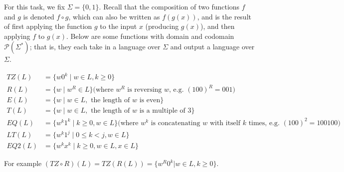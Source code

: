 \documentclass[12pt, oneside]{article}
\begin{document}
	For this task, we fix $\Sigma = \{0,1\}$. Recall that the composition of two 
	functions $f$ and $g$ is denoted $f \circ g$, which can also be written as $f(g(x))$, and is the 
	result of first applying the function $g$ to the input $x$ (producing $g(x)$), and then applying $f$ to $g(x)$. 
	Below are some functions with domain and codomain $\mathcal{P}(\Sigma^*)$; that is, they 
	each take in a language over $\Sigma$
	and output a language over $\Sigma$. 
	
	\begin{align*}
		TZ(L) &= \{ w0^k \mid w \in L, k \geq 0 \}\\
		R(L) &= \{ w \mid w^R \in L\} \textrm{(where $w^R$ is reversing $w$, e.g. $(100)^R = 001$)}\\
		E(L) &= \{ w \mid w \in L, \textrm{ the length of $w$ is even} \} \\
		T(L) &= \{ w \mid w \in L, \textrm{ the length of $w$ is a multiple of } 3 \}\\
		EQ(L) &= \{ w^k1^k \mid k \geq 0, w \in L \} \textrm{(where $w^k$ is concatenating $w$ with itself $k$ times, e.g. $(100)^2 = 100100$)}\\
		LT(L) &= \{ w^k1^j \mid 0 \leq k < j , w \in L \}\\
		EQ2(L) &= \{ w^kx^k \mid k \geq 0, w \in L, x \in L \}
	\end{align*}

	For example $(TZ \circ R)(L) = TZ(R(L)) = \{ w^R 0^k | w \in L, k \geq 0\}$.
\end{document}

